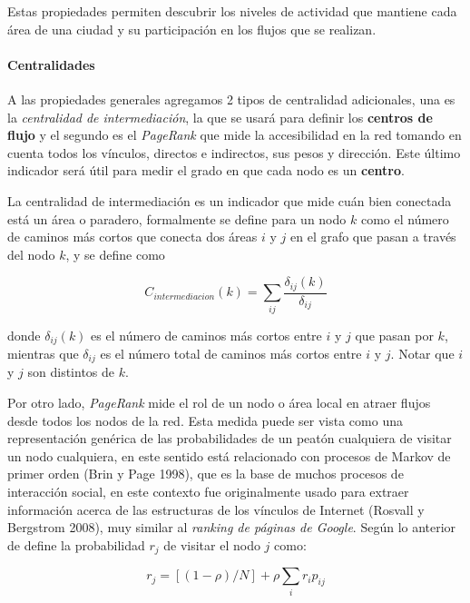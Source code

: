 \documentclass[12pt]{article}
\begin{document}
Estas propiedades permiten descubrir los niveles de actividad que mantiene cada área de una ciudad y su participación en los flujos que se realizan.

	\paragraph{Centralidades}
	
	A las propiedades generales agregamos 2 tipos de centralidad adicionales, una es la \textit{centralidad de intermediación}, la que se usará para definir los \textbf{centros de flujo} y el segundo es el \textit{PageRank} que mide la accesibilidad en la red tomando en cuenta todos los vínculos, directos e indirectos, sus pesos y dirección. Este último indicador será útil para medir el grado en que cada nodo es un \textbf{centro}.
	
	La centralidad de intermediación es un indicador que mide cuán bien conectada está un área o paradero, formalmente se define para un nodo $k$ como el número de caminos más cortos que conecta dos áreas $i$ y $j$ en el grafo que pasan a través del nodo $k$, y se define como
	
$$
	C_{intermediacion}(k) = \sum_{ij} \frac{\delta_{ij} (k)}{\delta_{ij}}
$$

donde $\delta_{ij}(k)$ es el número de caminos más cortos entre $i$ y $j$ que pasan por $k$, mientras que $\delta_{ij}$ es el número total de caminos más cortos entre $i$ y $j$. Notar que $i$ y $j$ son distintos de $k$.

Por otro lado, \textit{PageRank} mide el rol de un nodo o área local en atraer flujos desde todos los nodos de la red. Esta medida puede ser vista como una representación genérica de las probabilidades de un peatón cualquiera de visitar un nodo cualquiera, en este sentido está relacionado con procesos de Markov de primer orden (Brin y Page 1998)\cite{markov}, que es la base de muchos procesos de interacción social, en este contexto  fue originalmente usado para extraer información acerca de las estructuras de los vínculos de Internet (Rosvall y Bergstrom 2008)\cite{Infomap}, muy similar al \textit{ranking de páginas de Google}. Según lo anterior de define la probabilidad $r_j$ de visitar el nodo $j$ como:

$$
	r_j = [(1-\rho)/N]+\rho\sum_i r_ip_{ij}
$$
\end{document}
